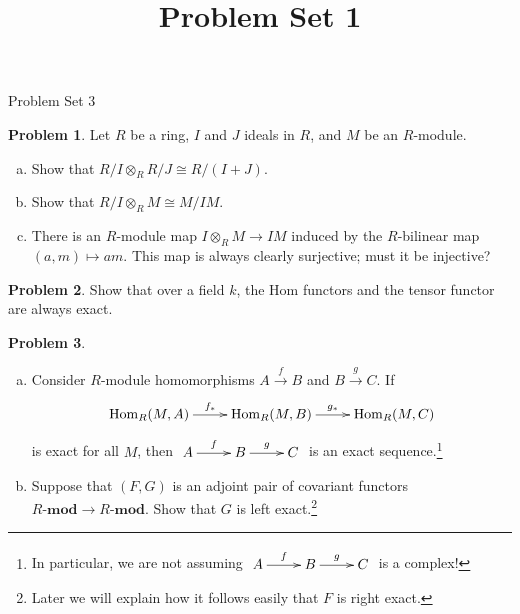 \documentclass[11pt]{article}
\title{}
\date{\vspace{-0.5in}}
\title{Problem Set 1}
\DeclareMathOperator{\Hom}{Hom}
\theoremstyle{definition}
\newtheorem{problem}{Problem}
\begin{document}
\thispagestyle{fancy}
\pagestyle{fancy}


\begin{center}
	{\LARGE Problem Set 3}
\end{center}



\begin{problem}
Let $R$ be a ring, $I$ and $J$ ideals in $R$, and $M$ be an $R$-module.
\begin{enumerate}[a)]
	\item Show that $R/I \otimes_R R/J \cong R/(I+J)$.
	\item Show that $R/I \otimes_R M \cong M/IM$.
	\item There is an $R$-module map $I \otimes_R M \longrightarrow IM$ induced by the $R$-bilinear map $(a,m) \mapsto am$. This map is always clearly surjective; must it be injective?
\end{enumerate}
\end{problem}

\vfill

\begin{problem}
	Show that over a field $k$, the Hom functors and the tensor functor are always exact.
\end{problem}



\vfill

\begin{problem}$\,$
	\begin{enumerate}[a)]
		\item Consider $R$-module homomorphisms $A \xrightarrow{f} B $ and $B \xrightarrow{g} C$. If
		$$\xymatrix{\Hom_R(M,A) \ar[r]^{f_*} & \Hom_R(M,B) \ar[r]^-{g_*} & \Hom_R(M,C)}$$
		is exact for all $M$, then $\xymatrix{A \ar[r]^-f & B \ar[r]^-g & C}$ is an exact sequence.\footnote{In particular, we are not assuming $\xymatrix{A \ar[r]^-f & B \ar[r]^-g & C}$ is a complex!}
		\item Suppose that $(F,G)$ is an adjoint pair of covariant functors $R\textbf{-mod} \longrightarrow R\textbf{-mod}$. Show that $G$ is left exact.\footnote{Later we will explain how it follows easily that $F$ is right exact.}
	\end{enumerate}
\end{problem}



\vspace{2em}

\noindent
{} 
\end{document}
